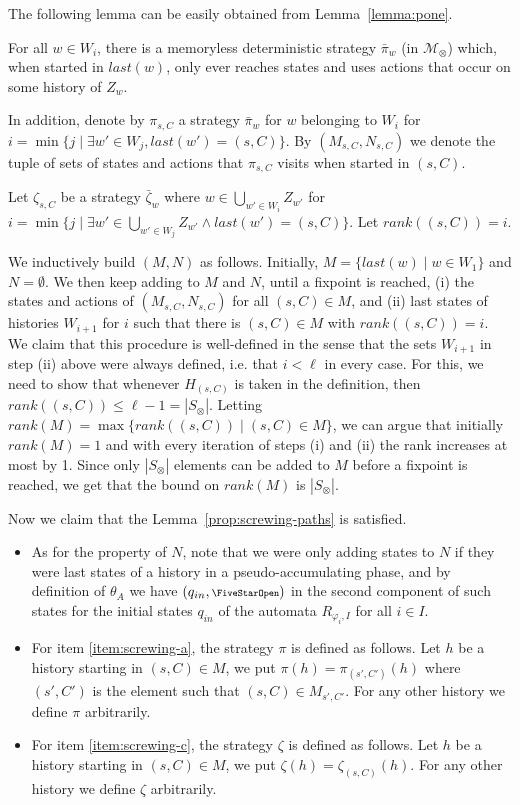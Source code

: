 \documentclass[a4paper,UKenglish]{lipics}
\newcommand{\symbopen}{\text{\scriptsize\FiveStarOpen}}
\newcommand{\mdp}{\mathcal{M}}
\newcommand{\rabin}{R}
\newcommand{\rank}[1]{\mathit{rank}(#1)}
\newcommand{\last}[1]{\mathit{last}(#1)}
\newcommand{\thetaa}{\theta_A}
\begin{document}
The following lemma can be easily obtained from Lemma~\ref{lemma:pone}.
\begin{lemma}
	For all $w\in W_i$, there is a memoryless deterministic strategy $\bar\pi_w$ (in $\mdp_\otimes$) which, when started in $\last{w}$, only ever reaches
	states and uses actions that occur on some history of $Z_w$.
\end{lemma}

In addition, denote by $\pi_{s,C}$
a strategy $\bar\pi_w$ for $w$ belonging to $W_i$ for $i = \min \{j \mid \exists w'\in W_j, \last{w'} = (s,C)\}$.
By $(M_{s,C},N_{s,C})$ we denote the tuple of sets of states and actions that $\pi_{s,C}$ visits when started in $(s,C)$.

Let $\zeta_{s,C}$ be a strategy $\bar\zeta_w$ where $w\in \bigcup_{w'\in W_{i}} Z_{w'}$ for $i= \min \{j \mid \exists w'\in \bigcup_{w'\in W_{j}} Z_{w'} \wedge \last{w'} = (s,C)\}$. Let $\rank{(s,C)} = i$.

We inductively build $(M,N)$ as follows. Initially, $M = \{\last{w} \mid w\in W_1\}$ and $N=\emptyset$. We then keep adding to $M$ and $N$, until a fixpoint is reached, (i) the states and actions of $(M_{s,C},N_{s,C})$ for all $(s,C)\in M$,
and (ii) last states of histories $W_{i+1}$ for $i$ such that there is $(s,C)\in M$ with $\rank{(s,C)} = i$.
We claim that this procedure is well-defined in the sense that
the sets $W_{i+1}$ in step (ii) above were always defined, i.e. that $i<\ell$ in every case.
For this, we need to show that whenever $H_{(s,C)}$ is taken in the definition,
then $\rank{(s,C)} \le \ell-1 = |S_\otimes|$. Letting
$\rank{M} = \max\{\rank{(s,C)} \mid (s,C)\in M\}$, we can argue that initially $\rank{M} = 1$ and with every iteration of steps (i) and (ii) the rank increases at most by 1.
Since only $|S_\otimes|$ elements can be added to $M$ before a fixpoint is reached, we get that the bound on $\rank{M}$ is $|S_{\otimes}|$.

Now we claim that the Lemma~\ref{prop:screwing-paths} is satisfied.
\begin{itemize}
 \item As for the property of $N$, note that
we were only adding states to $N$ if they were last states of a history in a pseudo-accumulating phase, and by definition of $\thetaa$ we have
$(q_{in}, \symbopen)$ in the second component of such states for the initial states $q_{in}$ of the automata $\rabin_{\varphi_i, I}$ for all $i\in I$.
 \item For item \ref{item:screwing-a}, the strategy $\pi$ is defined as follows. Let $h$ be a history starting in $(s,C)\in M$, we put $\pi(h) = \pi_{(s',C')}(h)$ where $(s',C')$ is the element such that $(s,C)\in M_{s',C'}$. For any other history we define $\pi$ arbitrarily.
 \item For item \ref{item:screwing-c}, the strategy $\zeta$ is defined as follows. Let $h$ be a history starting in $(s,C)\in M$, we put $\zeta(h) = \zeta_{(s,C)}(h)$. For any other history we define $\zeta$ arbitrarily.
\end{itemize}
\end{document}
